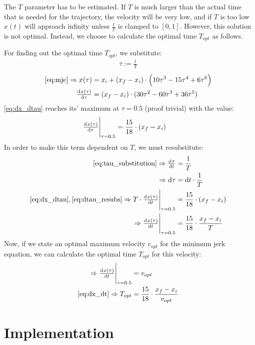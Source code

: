 \documentclass[11pt]{article}
\begin{document}
The $T$ parameter has to be estimated. If $T$ is much larger than  the actual time that is needed for the trajectory, the velocity will be very low, and if $T$ is too low $x(t)$ will approach infinity unless $\frac{t}{T}$ is clamped to $[0,1]$. However, this solution is not optimal. Instead, we choose to calculate the optimal time $T_{opt}$ as follows.%
\par
For finding out the optimal time $T_{opt}$, we substitute:
\begin{align}
  \label{eq:tau_substitution}
  \tau:=\frac{t}{T}
\end{align}
\begin{align}
\ref{eq:mje}\Rightarrow x(\tau)&= x_i +  (x_f - x_i) \cdot \left(10\tau^3 - 15\tau^4 + 6\tau^6 \right)\\
\od{x(\tau)}{\tau}&= (x_f - x_i)\cdot(30\tau^2-60\tau^3+36\tau^5)\label{eq:dx_dtau}
\end{align}
\ref{eq:dx_dtau} reaches its' maximum at $\tau=0.5$ (proof trivial) with the value:
\begin{align}
  \eval{\od{x(\tau)}{\tau}}_{\tau=0.5}&=\frac{15}{18}\cdot(x_f - x_i)
\end{align}
In order to make this term dependent on $T$, we must resubstitute:
\begin{align}
  \ref{eq:tau_substitution}\Rightarrow \od{\tau}{t}&=\frac{1}{T}\\
  \Rightarrow\dif\tau&=\dif t\cdot\frac{1}{T}\label{eq:dtau_resubs}\\
  \ref{eq:dx_dtau},\ref{eq:dtau_resubs}\Rightarrow\eval{T\cdot\od{x(\tau)}{t}}_{\tau=0.5}&=\frac{15}{18}\cdot(x_f - x_i)\\
  \Rightarrow\eval{\od{x(\tau)}{t}}_{\tau=0.5}&=\frac{15}{18}\cdot\frac{x_f - x_i}{T}\label{eq:dx_dt}
\end{align}
Now, if we state an optimal maximum velocity $v_{opt}$ for the minimum jerk equation, we can calculate the optimal time $T_{opt}$ for this velocity:
\begin{align}
  \Rightarrow\eval{\od{x(\tau)}{t}}_{\tau=0.5}&=v_{opt}\\
  \ref{eq:dx_dt}\Rightarrow T_{opt}&=\frac{15}{18}\cdot\frac{x_f - x_i}{v_{opt}}
\end{align}
\par

\section{Implementation}
\end{document}
